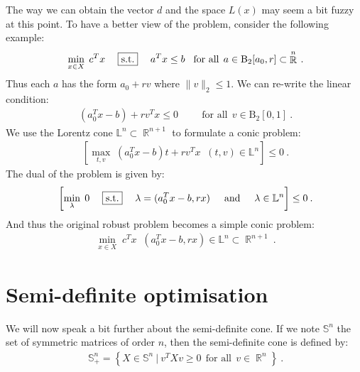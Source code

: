 \documentclass[12pt,a4paper]{article}
\theoremstyle{definition}
\theoremstyle{plain}
\DeclareMathOperator{\reals}{\mathbb{R}}
\DeclareMathOperator{\suchthat}{\;\;\;\;\boxed{\text{s.t.}}\;\;\;\;}
\begin{document}
The way we can obtain the vector $d$ and the space $L(x)$ may seem a bit fuzzy at this point. To have a better view of the problem, consider the following example:
\begin{align*}
\: \min_{x\in X}\; c^Tx \suchthat  a^Tx \leq b \hspace{3mm}\text{for all}\:\:a\in \mathrm{B}_2[a_0,r] \subset \reals^n \:.
\end{align*}
Thus each $a$ has the form $a_0 + rv$ where $\|v\|_2 \leq 1$. We can re-write the linear condition:
\begin{align*}
\: (a_0^Tx - b) + rv^Tx \leq 0 \hspace{1cm}\text{for all}\:\:v\in \mathrm{B}_2[0,1] \:.
\end{align*}
We use the Lorentz cone $\mathbb{L}^n \subset \reals^{n+1}$ to formulate a conic problem:
\begin{align*}
\: \left[ \max_{t,v}\; (a_0^Tx - b)t + rv^Tx \suchthat (t,v)\in \mathbb{L}^n \right] \leq 0 \:.
\end{align*}
The dual of the problem is given by:
\begin{align*}
\: \left[ \min_{\lambda}\; 0 \suchthat \lambda = (a_0^Tx - b,rx) \hspace{5mm}\text{and}\hspace{5mm} \lambda\in \mathbb{L}^n \right] \leq 0 \:.
\end{align*}
And thus the original robust problem becomes a simple conic problem:
\begin{align*}
\: \min_{x\in X}\; c^Tx \suchthat  (a_0^Tx - b,rx) \in \mathbb{L}^n \subset \reals^{n+1} \:.
\end{align*}


\section{Semi-definite optimisation}

We will now speak a bit further about the semi-definite cone. If we note $\mathbb{S}^n$ the set of symmetric matrices of order $n$, then the semi-definite cone is defined by:
\begin{align*}
\: \mathbb{S}^n_+ = \left\lbrace X \in \mathbb{S}^n \:\big|\: v^TXv \geq 0 \:\:\text{for all}\:\:v\in \reals^n \right\rbrace \:.
\end{align*}
\end{document}
